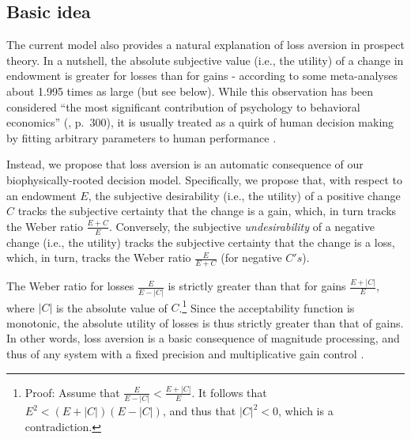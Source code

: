 \documentclass[
]{article}
\begin{document}
\subsection{Basic idea}\label{basic-idea}

The current model also provides a natural explanation of loss aversion in prospect theory. In a nutshell, the absolute subjective value (i.e., the utility) of a change in endowment is greater for losses than for gains - according to some meta-analyses about 1.995 times as large \autocite{Brown2024} (but see below). While this observation has been considered ``the most significant contribution of psychology to behavioral economics'' (\autocite{Kahneman2011}, p.~300), it is usually treated as a quirk of human decision making by fitting arbitrary parameters to human performance \autocite{Tversky1992,Abdellaoui2007,Booij2009}.

Instead, we propose that loss aversion is an automatic consequence of our biophysically-rooted decision model. Specifically, we propose that, with respect to an endowment \(E\), the subjective desirability (i.e., the utility) of a positive change \(C\) tracks the subjective certainty that the change is a gain, which, in turn tracks the Weber ratio \(\frac{E + C}{E}\). Conversely, the subjective \emph{undesirability} of a negative change (i.e., the utility) tracks the subjective certainty that the change is a loss, which, in turn, tracks the Weber ratio \(\frac{E}{E + C}\) (for negative \(C's\)).

The Weber ratio for losses \(\frac{E}{E - |C|}\) is strictly greater than that for gains \(\frac{E + |C|}{E}\), where \(|C|\) is the absolute value of \(C\).\footnote{Proof: Assume that \(\frac{E}{E - |C|} < \frac{E + |C|}{E}\). It follows that \(E^2 < (E + |C|)(E - |C|)\), and thus that \(|C|^2 < 0\), which is a contradiction.} Since the acceptability function is monotonic, the absolute utility of losses is thus strictly greater than that of gains. In other words, loss aversion is a basic consequence of magnitude processing, and thus of any system with a fixed precision and multiplicative gain control \autocite{Endress-Catastrophic-Interference}.
\end{document}
